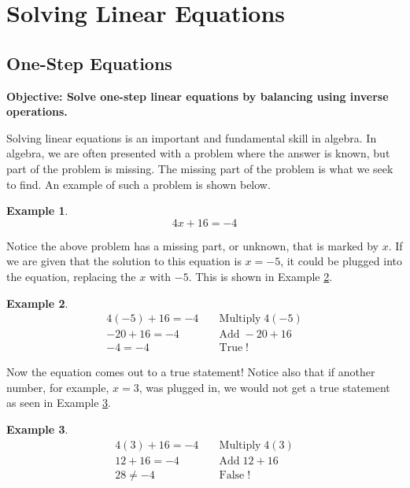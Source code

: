 \documentclass[12pt]{book}
\theoremstyle{definition}
\newtheorem{example}{Example}
\newcommand{\tmop}[1]{\ensuremath{\operatorname{#1}}}
\begin{document}
\section{Solving Linear Equations}
\subsection{One-Step Equations}
%
{\bf Objective: Solve one-step linear equations by balancing using inverse operations.}\par
Solving linear equations is an important and fundamental skill in algebra. In algebra, we are often presented with a problem where the answer is known, but part of the problem is missing. The missing part of the problem is what we seek to find. An example of such a problem is shown below.
\begin{example}\label{Lin1}
\[ 4 x + 16 = - 4 \]
\end{example}
Notice the above problem has a missing part, or unknown, that is marked by $x$. If we are given that the solution to this equation is $x=- 5$, it could be plugged into the equation, replacing the $x$ with $- 5$. This is shown in Example \ref{Lin2}.
\begin{example}\label{Lin2}
\begin{eqnarray*}
  4 (- 5) + 16 = - 4 &  & \tmop{Multiply} 4 (- 5)\\
  - 20 + 16 = - 4 &  & \tmop{Add} - 20 + 16\\
  - 4 = - 4 &  & \tmop{True} !
\end{eqnarray*}
\end{example}
Now the equation comes out to a true statement! Notice also that if another number, for example, $x=3$, was plugged in, we would not get a true statement as seen in Example \ref{Lin3}.
\begin{example}\label{Lin3}
 \begin{eqnarray*}
  4 (3) + 16 = - 4 &  & \tmop{Multiply} 4 (3)\\
  12 + 16 = - 4 &  & \tmop{Add} 12 + 16\\
  28 \neq - 4 &  & \tmop{False} !
\end{eqnarray*}
\end{example}
\end{document}
